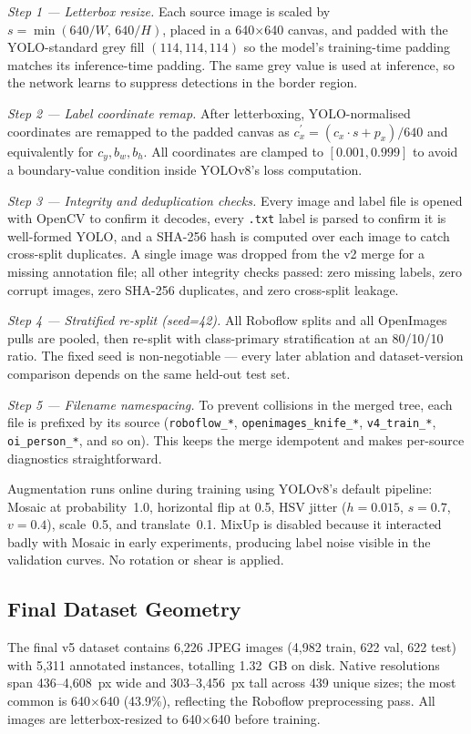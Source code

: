 \documentclass{ieeeaccess}
\begin{document}
\textit{Step 1 --- Letterbox resize.} Each source image is scaled by $s=\min(640/W,\,640/H)$, placed in a 640$\times$640 canvas, and padded with the YOLO-standard grey fill $(114,114,114)$ so the model's training-time padding matches its inference-time padding. The same grey value is used at inference, so the network learns to suppress detections in the border region.

\textit{Step 2 --- Label coordinate remap.} After letterboxing, YOLO-normalised coordinates are remapped to the padded canvas as $c_x^\prime = (c_x \cdot s + p_x)/640$ and equivalently for $c_y, b_w, b_h$. All coordinates are clamped to $[0.001, 0.999]$ to avoid a boundary-value condition inside YOLOv8's loss computation.

\textit{Step 3 --- Integrity and deduplication checks.} Every image and label file is opened with OpenCV to confirm it decodes, every \texttt{.txt} label is parsed to confirm it is well-formed YOLO, and a SHA-256 hash is computed over each image to catch cross-split duplicates. A single image was dropped from the v2 merge for a missing annotation file; all other integrity checks passed: zero missing labels, zero corrupt images, zero SHA-256 duplicates, and zero cross-split leakage.

\textit{Step 4 --- Stratified re-split (seed=42).} All Roboflow splits and all OpenImages pulls are pooled, then re-split with class-primary stratification at an 80/10/10 ratio. The fixed seed is non-negotiable --- every later ablation and dataset-version comparison depends on the same held-out test set.

\textit{Step 5 --- Filename namespacing.} To prevent collisions in the merged tree, each file is prefixed by its source (\texttt{roboflow\_*}, \texttt{openimages\_knife\_*}, \texttt{v4\_train\_*}, \texttt{oi\_person\_*}, and so on). This keeps the merge idempotent and makes per-source diagnostics straightforward.

Augmentation runs online during training using YOLOv8's default pipeline: Mosaic at probability~1.0, horizontal flip at 0.5, HSV jitter ($h{=}0.015$, $s{=}0.7$, $v{=}0.4$), scale~0.5, and translate~0.1. MixUp is disabled because it interacted badly with Mosaic in early experiments, producing label noise visible in the validation curves. No rotation or shear is applied.

\subsection{Final Dataset Geometry}
\label{sec:dataset_geometry}
The final v5 dataset contains 6{,}226 JPEG images (4{,}982 train, 622 val, 622 test) with 5{,}311 annotated instances, totalling 1.32~GB on disk. Native resolutions span 436--4{,}608~px wide and 303--3{,}456~px tall across 439 unique sizes; the most common is 640$\times$640 (43.9\%), reflecting the Roboflow preprocessing pass. All images are letterbox-resized to 640$\times$640 before training.
\end{document}
